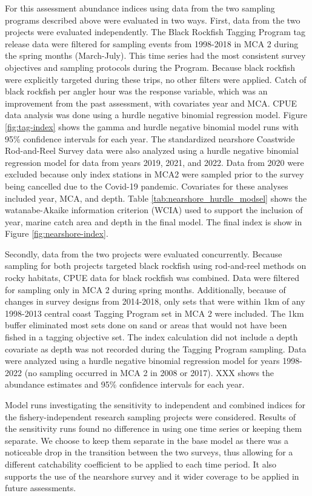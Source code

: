 \documentclass[11pt,
  english,
  letterpaper,
]{article}
\begin{document}
For this assessment abundance indices using data from the two sampling programs described above were evaluated in two ways. First, data from the two projects were evaluated independently. The Black Rockfish Tagging Program tag release data were filtered for sampling events from 1998-2018 in MCA 2 during the spring months (March-July). This time series had the most consistent survey objectives and sampling protocols during the Program. Because black rockfish were explicitly targeted during these trips, no other filters were applied. Catch of black rockfish per angler hour was the response variable, which was an improvement from the past assessment, with covariates year and MCA. CPUE data analysis was done using a hurdle negative binomial regression model. Figure \ref{fig:tag-index} shows the gamma and hurdle negative binomial model runs with 95\% confidence intervals for each year. The standardized nearshore Coastwide Rod-and-Reel Survey data were also analyzed using a hurdle negative binomial regression model for data from years 2019, 2021, and 2022. Data from 2020 were excluded because only index stations in MCA2 were sampled prior to the survey being cancelled due to the Covid-19 pandemic. Covariates for these analyses included year, MCA, and depth. Table \ref{tab:nearshore_hurdle_modsel} shows the watanabe-Akaike information criterion (WCIA) used to support the inclusion of year, marine catch area and depth in the final model. The final index is show in Figure \ref{fig:nearshore-index}.

Secondly, data from the two projects were evaluated concurrently. Because sampling for both projects targeted black rockfish using rod-and-reel methods on rocky habitats, CPUE data for black rockfish was combined. Data were filtered for sampling only in MCA 2 during spring months. Additionally, because of changes in survey designs from 2014-2018, only sets that were within 1km of any 1998-2013 central coast Tagging Program set in MCA 2 were included. The 1km buffer eliminated most sets done on sand or areas that would not have been fished in a tagging objective set. The index calculation did not include a depth covariate as depth was not recorded during the Tagging Program sampling. Data were analyzed using a hurdle negative binomial regression model for years 1998-2022 (no sampling occurred in MCA 2 in 2008 or 2017). XXX shows the abundance estimates and 95\% confidence intervals for each year.

Model runs investigating the sensitivity to independent and combined indices for the fishery-independent research sampling projects were considered. Results of the sensitivity runs found no difference in using one time series or keeping them separate. We choose to keep them separate in the base model as there was a noticeable drop in the transition between the two surveys, thus allowing for a different catchability coefficient to be applied to each time period. It also supports the use of the nearshore survey and it wider coverage to be applied in future assessments.
\end{document}
